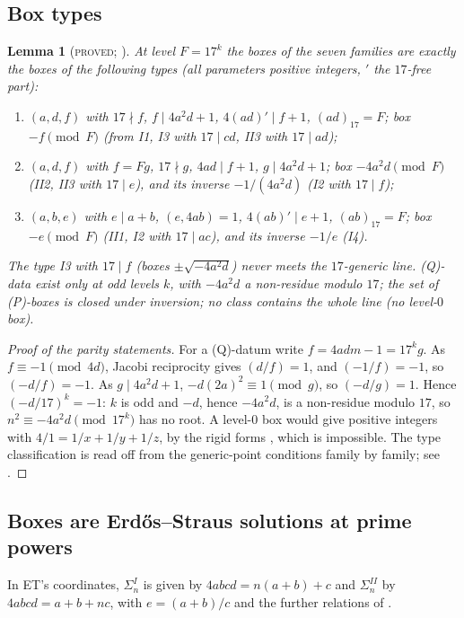 \documentclass[11pt,reqno]{amsart}
\newtheorem{lemma}[theorem]{Lemma}
\theoremstyle{definition}
\newcommand{\status}[1]{\textup{\textsc{#1}}}
\begin{document}
\subsection{Box types}

\begin{lemma}[\status{proved}; {\cite[Lemmas~1.1, 1.3]{PM17}}]\label{lem:boxtypes}
At level $F=17^k$ the boxes of the seven families are exactly the boxes
of the following types (all parameters positive integers, ${}'$ the
$17$-free part):
\begin{enumerate}
\item[(P)] $(a,d,f)$ with $17\nmid f$, $f\mid4a^2d+1$, $4(ad)'\mid f+1$,
$(ad)_{17}=F$; box $-f\pmod F$ (from I1, I3 with $17\mid cd$, II3 with
$17\mid ad$);
\item[(Q)] $(a,d,f)$ with $f=Fg$, $17\nmid g$, $4ad\mid f+1$, $g\mid
4a^2d+1$; box $-4a^2d\pmod F$ (II2, II3 with $17\mid e$), and its inverse
$-1/(4a^2d)$ (I2 with $17\mid f$);
\item[(U)] $(a,b,e)$ with $e\mid a+b$, $(e,4ab)=1$, $4(ab)'\mid e+1$,
$(ab)_{17}=F$; box $-e\pmod F$ (II1, I2 with $17\mid ac$), and its
inverse $-1/e$ (I4).
\end{enumerate}
The type I3 with $17\mid f$ (boxes $\pm\sqrt{-4a^2d}$) never meets the
$17$-generic line.  (Q)-data exist only at odd levels $k$, with $-4a^2d$
a non-residue modulo $17$; the set of (P)-boxes is closed under
inversion; no class contains the whole line (no level-$0$ box).
\end{lemma}

\begin{proof}[Proof of the parity statements]
For a (Q)-datum write $f=4adm-1=17^kg$.  As $f\equiv-1\pmod{4d}$, Jacobi
reciprocity gives $(d/f)=1$, and $(-1/f)=-1$, so $(-d/f)=-1$.  As
$g\mid4a^2d+1$, $-d(2a)^2\equiv1\pmod g$, so $(-d/g)=1$.  Hence
$(-d/17)^k=-1$: $k$ is odd and $-d$, hence $-4a^2d$, is a non-residue
modulo $17$, so $n^2\equiv-4a^2d\pmod{17^k}$ has no root.  A level-$0$
box would give positive integers with $4/1=1/x+1/y+1/z$, by the rigid
forms \cite[Cor.~2.4]{PM17}, which is impossible.  The type
classification is read off from the generic-point conditions family by
family; see \cite[\S1]{PM17}.
\end{proof}

\subsection{Boxes are Erd\H{o}s--Straus solutions at prime powers}
In ET's coordinates, $\Sigma^I_n$ is given by $4abcd=n(a+b)+c$ and
$\Sigma^{II}_n$ by $4abcd=a+b+nc$, with $e=(a+b)/c$ and the further
relations of \cite[\S2]{ET}.
\end{document}
